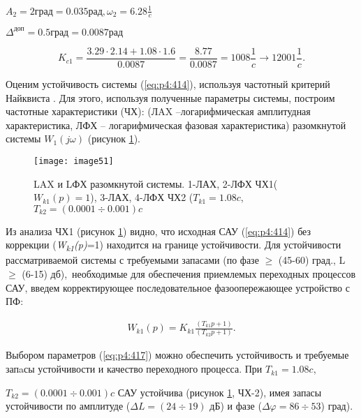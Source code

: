 $A_2 = 2 \textit{град} = 0.035 \textit{рад}, \omega_2 = 6.28 \frac{1}{c}$

$\varDelta^{\textit{доп}} =  0.5 \textit{град} = 0.0087 \textit{рад}$

\[ K_{c1}=\frac{3.29 \cdot 2.14 + 1.08 \cdot 1.6}{0.0087} =
\frac{8.77}{0.0087} =
1008 \frac{1}{c} \rightarrow 1200  1 \frac{1}{c}. \] \par

Оценим устойчивость системы (\ref{eq:p4:414}), используя частотный критерий Найквиста \cite[]{Bessekerski}. Для этого, используя полученные параметры системы, построим частотные характеристики (ЧХ): (ЛAX –логарифмическая амплитудная характеристика, ЛФХ – логарифмическая фазовая характеристика) разомкнутой системы $W_1(j \omega)$ (рисунок \ref{fig:LogAmpChar1}).\par

\begin{figure}[ht]
	\centering
	\texttt{[image: image51]} 
	\caption{LAX и LФХ разомкнутой системы. 1-ЛАХ, 2-ЛФХ ЧХ1($W_{k1}(p)=1 $), 3-ЛАХ, 4-ЛФХ ЧХ2 ($T_{k1} = 1.08 c$, $T_{k2} = (0.0001  \div 0.001) c$}
	\label{fig:LogAmpChar1}
\end{figure}

Из анализа ЧХ1 (рисунок \ref{fig:LogAmpChar1}) видно, что исходная САУ (\ref{eq:p4:414}) без коррекции (\textit{W\textsubscript{k1}(p)}=1) находится на границе устойчивости. Для устойчивости рассматриваемой системы с требуемыми запасами (по фазе  $ \geq $  (45-60) град., L $ \geq $  (6-15) дб),\ необходимые для обеспечения приемлемых переходных процессов САУ, введем корректирующее последовательное фазоопережающее устройство с ПФ:

\begin{equation}%
\label{eq:p4:417}
\begin{alignedat}{2}
W_{k1} \left( p \right) =K_{k1}\frac{ \left( T_{k1}p+1 \right) }{ \left( T_{k2}p+1 \right) }.
\end{alignedat}
\end{equation}

Выбором параметров (\ref{eq:p4:417}) можно обеспечить устойчивость и требуемые запaсы устойчивости и качество переходного процесса. При $T_{k1} = 1.08 c$, \par

$T_{k2} = (0.0001  \div 0.001) c$  САУ устойчива (рисунок \ref{fig:LogAmpChar1}, ЧХ-2), имея запасы устойчивости по амплитуде ($\varDelta L = (24 \div 19)$ дБ) и фазе ($\varDelta \varphi = 86 \div 53$) град).\par

